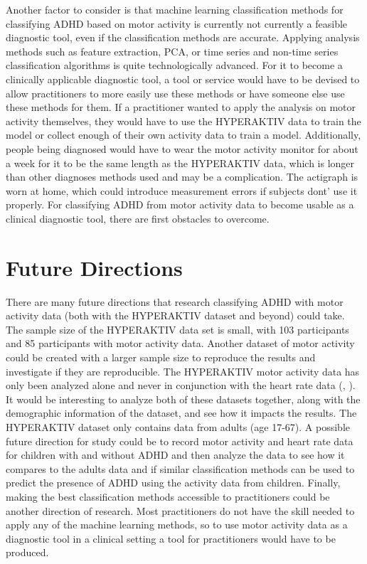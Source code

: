 \documentclass[,article,,moreauthors,pdftex]{mdpi}
\begin{document}
Another factor to consider is that machine learning classification
methods for classifying ADHD based on motor activity is currently not
currently a feasible diagnostic tool, even if the classification methods
are accurate. Applying analysis methods such as feature extraction, PCA,
or time series and non-time series classification algorithms is quite
technologically advanced. For it to become a clinically applicable
diagnostic tool, a tool or service would have to be devised to allow
practitioners to more easily use these methods or have someone else use
these methods for them. If a practitioner wanted to apply the analysis
on motor activity themselves, they would have to use the HYPERAKTIV data
to train the model or collect enough of their own activity data to train
a model. Additionally, people being diagnosed would have to wear the
motor activity monitor for about a week for it to be the same length as
the HYPERAKTIV data, which is longer than other diagnoses methods used
and may be a complication. The actigraph is worn at home, which could
introduce measurement errors if subjects dont' use it properly. For
classifying ADHD from motor activity data to become usable as a clinical
diagnostic tool, there are first obstacles to overcome.

\hypertarget{future-directions}{%
\section{Future Directions}\label{future-directions}}

There are many future directions that research classifying ADHD with
motor activity data (both with the HYPERAKTIV dataset and beyond) could
take. The sample size of the HYPERAKTIV data set is small, with 103
participants and 85 participants with motor activity data. Another
dataset of motor activity could be created with a larger sample size to
reproduce the results and investigate if they are reproducible. The
HYPERAKTIV motor activity data has only been analyzed alone and never in
conjunction with the heart rate data (\citet{10.1145/3458305.3478454},
\citet{kaur_accurate_2022}). It would be interesting to analyze both of
these datasets together, along with the demographic information of the
dataset, and see how it impacts the results. The HYPERAKTIV dataset only
contains data from adults (age 17-67). A possible future direction for
study could be to record motor activity and heart rate data for children
with and without ADHD and then analyze the data to see how it compares
to the adults data and if similar classification methods can be used to
predict the presence of ADHD using the activity data from children.
Finally, making the best classification methods accessible to
practitioners could be another direction of research. Most practitioners
do not have the skill needed to apply any of the machine learning
methods, so to use motor activity data as a diagnostic tool in a
clinical setting a tool for practitioners would have to be produced.
\end{document}

